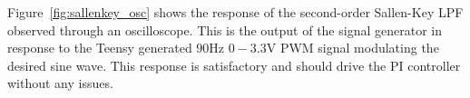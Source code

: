 
Figure~\ref{fig:sallenkey_osc} shows the response of the second-order Sallen-Key
LPF observed through an oscilloscope. This is the output of the signal generator
in response to the Teensy generated $90$\unit{\hertz} $0-3.3$\unit{\volt} PWM
signal modulating the desired sine wave. This response is satisfactory and
should drive the PI controller without any issues.


